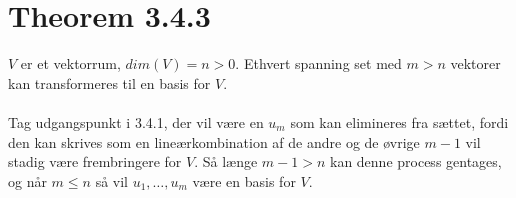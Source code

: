 \documentclass[a4paper,oneside,article]{memoir}
\begin{document}
    \section{Theorem 3.4.3}
	$V$ er et vektorrum, $dim(V)=n>0$. Ethvert spanning set med
	$m>n$ vektorer kan transformeres til en basis for $V$.
	\\
	\\
	Tag udgangspunkt i 3.4.1, der vil være en $u_m$ som kan 
	elimineres fra sættet, fordi den kan skrives som en 
	lineærkombination af de andre og de øvrige $m-1$ vil stadig
	være frembringere for $V$. Så længe $m-1>n$ kan denne
	process gentages, og når $m\leq n$ så vil $u_1,\dots,u_m$
	være en basis for $V$.
    
\end{document}
